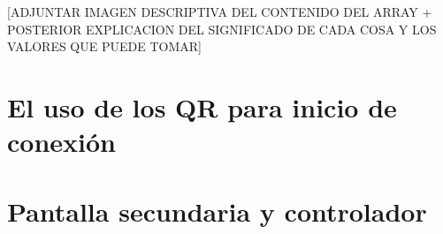 [ADJUNTAR IMAGEN DESCRIPTIVA DEL CONTENIDO DEL ARRAY + POSTERIOR EXPLICACION DEL SIGNIFICADO DE CADA COSA Y LOS VALORES QUE PUEDE TOMAR]

\section{El uso de los QR para inicio de conexi\'on}
\label{cap4:QR}



\section{Pantalla secundaria y controlador}
\label{cap4:pantallasecundaria}





